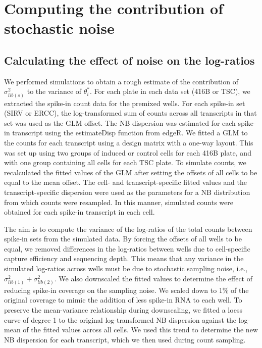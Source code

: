 \documentclass{article}
\begin{document}
\section{Computing the contribution of stochastic noise}

\subsection{Calculating the effect of noise on the log-ratios}
We performed simulations to obtain a rough estimate of the contribution of $\sigma^2_{lib(s)}$ to the variance of $\theta^*_i$.
For each plate in each data set (416B or TSC), we extracted the spike-in count data for the premixed wells.
For each spike-in set (SIRV or ERCC), the log-transformed sum of counts across all transcripts in that set was used as the GLM offset. 
The NB dispersion was estimated for each spike-in transcript using the estimateDisp function from edgeR.
We fitted a GLM to the counts for each transcript using a design matrix with a one-way layout.
This was set up using two groups of induced or control cells for each 416B plate, and with one group containing all cells for each TSC plate.
To simulate counts, we recalculated the fitted values of the GLM after setting the offsets of all cells to be equal to the mean offset.
The cell- and transcript-specific fitted values and the transcript-specific dispersion were used as the parameters for a NB distribution from which counts were resampled.
In this manner, simulated counts were obtained for each spike-in transcript in each cell.

The aim is to compute the variance of the log-ratios of the total counts between spike-in sets from the simulated data.
By forcing the offsets of all wells to be equal, we removed differences in the log-ratios between wells due to cell-specific capture efficiency and sequencing depth.
This means that any variance in the simulated log-ratios across wells must be due to stochastic sampling noise, i.e.,  $\sigma^2_{lib(1)} + \sigma^2_{lib(2)}$.
We also downscaled the fitted values to determine the effect of reducing spike-in coverage on the sampling noise.
We scaled down to 1\% of the original coverage to mimic the addition of less spike-in RNA to each well.
To preserve the mean-variance relationship during downscaling, we fitted a loess curve of degree 1 to the original log-transformed NB dispersion against the log-mean of the fitted values across all cells.
We used this trend to determine the new NB dispersion for each transcript, which we then used during count sampling.
\end{document}
